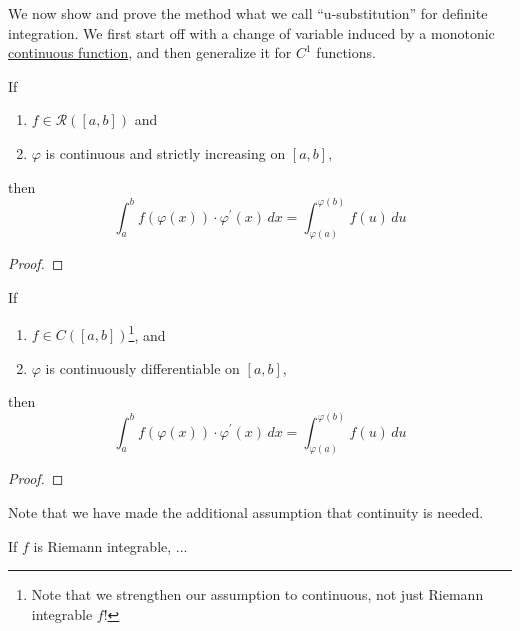   We now show and prove the method what we call ``u-substitution'' for definite integration. We first start off with a change of variable induced by a monotonic \hyperref[pst-def:continuous_func]{continuous function}, and then generalize it for $C^1$ functions.  

  \begin{theorem}
    \label{thm:change-of-variable-for-monotonic-functions}
    If
    \begin{enumerate}
      \item $f \in \mathcal{R}([a, b])$ and 
      \item $\varphi$ is continuous and strictly increasing on $[a, b]$, 
    \end{enumerate}
    then 
    \begin{equation}
      \int_a^b f(\varphi(x)) \cdot \varphi^\prime (x) \,dx = \int_{\varphi(a)}^{\varphi(b)} f(u) \,du
    \end{equation}
  \end{theorem}
  \begin{proof}
    
  \end{proof}

  \begin{theorem}
    \label{thm:change-of-variable}
    If
    \begin{enumerate}
      \item $f \in C([a, b])$\footnote{Note that we strengthen our assumption to continuous, not just Riemann integrable $f$!}, and 
      \item $\varphi$ is continuously differentiable on $[a, b]$, 
    \end{enumerate}
    then 
    \begin{equation}
      \int_a^b f(\varphi(x)) \cdot \varphi^\prime (x) \,dx = \int_{\varphi(a)}^{\varphi(b)} f(u) \,du
    \end{equation}
  \end{theorem}
  \begin{proof}
  \end{proof}

  Note that we have made the additional assumption that continuity is needed. 

  \begin{example}
    \label{ex:counterexample-when-f-is-not-continuous}
    If $f$ is Riemann integrable, ...
  \end{example}

